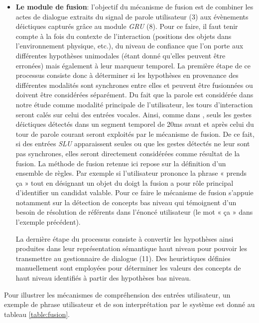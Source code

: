 \documentclass[a4paper,11pt,twoside]{StyleThese}
\begin{document}
\begin{itemize}
\item \textbf{Le module de fusion}: l’objectif du mécanisme de fusion est de combiner les actes de dialogue extraits du
signal de parole utilisateur (3) aux évènements déictiques capturés grâce au module \textit{GRU} (8).
Pour ce faire, il faut tenir compte à la fois du contexte de l’interaction (positions des objets dans l’environnement physique, etc.), du niveau de confiance que l’on porte aux différentes hypothèses unimodales (étant donné qu’elles peuvent être erronées) mais également à leur marqueur temporel.
La première étape de ce processus consiste donc à déterminer si les hypothèses en
provenance des différentes modalités sont synchrones entre elles et peuvent être fusionnées ou doivent être considérées séparément. Du fait que la parole est considérée dans notre étude comme modalité principale de l’utilisateur, les tours d’interaction seront calés sur celui des entrées vocales. Ainsi, comme dans \cite{Holzapfel2004}, seuls les gestes déictiques détectés dans un segment temporel de 20ms avant et après celui du tour de parole courant seront exploités par le mécanisme de fusion. De ce fait, si des entrées \textit{SLU} apparaissent seules ou que les gestes détectés ne leur sont pas synchrones, elles seront directement considérées comme résultat de la fusion. La méthode de fusion retenue ici repose sur la définition d’un ensemble
de règles.
Par exemple si l’utilisateur prononce la
phrase « prends ça » tout en désignant un objet du doigt la fusion a pour rôle principal d’identifier un candidat valable. Pour ce faire le mécanisme de fusion s’appuie notamment sur la détection de concepts bas niveau qui témoignent d’un besoin de résolution de référents dans l’énoncé utilisateur (le mot « ça » dans l’exemple précédent).

La dernière étape du processus consiste à convertir les hypothèses ainsi produites
dans leur représentation sémantique haut niveau pour pouvoir les transmettre au gestionnaire de dialogue (11).
Des heuristiques définies manuellement sont employées pour déterminer les valeurs
des concepts de haut niveau identifiés à partir des hypothèses bas niveau.
\end{itemize}

Pour illustrer les mécanismes de compréhension des entrées utilisateur, un exemple de phrase utilisateur et de son interprétation par le système est donné au tableau \ref{table:fusion}.

\end{document}
